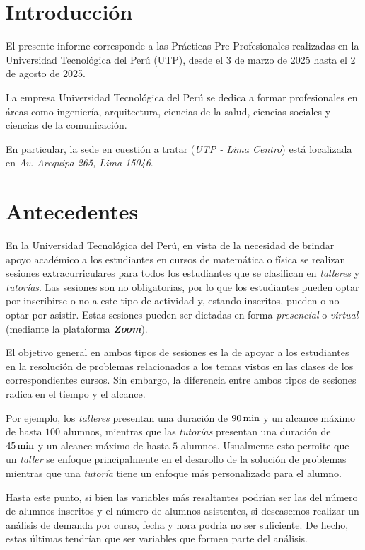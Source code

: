 \documentclass[11pt,a4paper]{book}
\theoremstyle{definition}%
\begin{document}
    \chapter{Introducción}
        El presente informe corresponde a las Prácticas Pre-Profesionales realizadas en la
        Universidad Tecnológica del Perú (UTP), desde el 3 de marzo de 2025 hasta el 2 de agosto de 2025.
        
        La empresa Universidad Tecnológica del Perú se dedica a formar profesionales en áreas como ingeniería, arquitectura, ciencias de la salud, ciencias sociales y ciencias de la comunicación.
        
        En particular, la sede en cuestión a tratar (\textit{UTP - Lima Centro}) está localizada en \textit{Av. Arequipa 265, Lima 15046}.
        
    \chapter{Antecedentes}
        En la Universidad Tecnológica del Perú, en vista de la necesidad de brindar apoyo académico a los estudiantes en cursos de matemática o física se realizan sesiones extracurriculares para todos los estudiantes que se clasifican en \textit{talleres} y \textit{tutorías}. Las sesiones son no obligatorias, por lo que los estudiantes pueden optar por inscribirse o no a este tipo de actividad y, estando inscritos, pueden o no optar por asistir. Estas sesiones pueden ser dictadas en forma \textit{presencial} o \textit{virtual} (mediante la plataforma \textbf{\textit{Zoom}}).
        
        El objetivo general en ambos tipos de sesiones es la de apoyar a los estudiantes en la resolución de problemas relacionados a los temas vistos en las clases de los correspondientes cursos. Sin embargo, la diferencia entre ambos tipos de sesiones radica en el tiempo y el alcance.
        
        Por ejemplo, los \textit{talleres} presentan una duración de $90\,\textup{min}$ y un alcance máximo de hasta $100$ alumnos, mientras que las \textit{tutorías} presentan una duración de $45\,\textup{min}$ y un alcance máximo de hasta $5$ alumnos. Usualmente esto permite que un \textit{taller} se enfoque principalmente en el desarollo de la solución de problemas mientras que una \textit{tutoría} tiene un enfoque más personalizado para el alumno.

        Hasta este punto, si bien las variables más resaltantes podrían ser las del número de alumnos inscritos y el número de alumnos asistentes, si deseasemos realizar un análisis de demanda por curso, fecha y hora podria no ser suficiente. De hecho, estas últimas tendrían que ser variables que formen parte del análisis.
\end{document}
